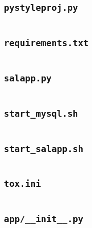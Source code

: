 \subsection{\texttt{pystyleproj.py}}
\begin{codelisting}
\inputminted[breakanywhere]{python3}{../uswacs-2-iy2d502-salapp/pystyleproj.py}\end{codelisting}
\subsection{\texttt{requirements.txt}}
\begin{codelisting}
\inputminted[breakanywhere]{text}{../uswacs-2-iy2d502-salapp/requirements.txt}\end{codelisting}
\subsection{\texttt{salapp.py}}
\begin{codelisting}
\inputminted[breakanywhere]{python3}{../uswacs-2-iy2d502-salapp/salapp.py}\end{codelisting}
\subsection{\texttt{start\_mysql.sh}}
\begin{codelisting}
\inputminted[breakanywhere]{bash}{../uswacs-2-iy2d502-salapp/start_mysql.sh}\end{codelisting}
\subsection{\texttt{start\_salapp.sh}}
\begin{codelisting}
\inputminted[breakanywhere]{bash}{../uswacs-2-iy2d502-salapp/start_salapp.sh}\end{codelisting}
\subsection{\texttt{tox.ini}}
\begin{codelisting}
\inputminted[breakanywhere]{text}{../uswacs-2-iy2d502-salapp/tox.ini}\end{codelisting}
\subsection{\texttt{app/\_\_init\_\_.py}}
\begin{codelisting}
\inputminted[breakanywhere]{python3}{../uswacs-2-iy2d502-salapp/app/__init__.py}\end{codelisting}
